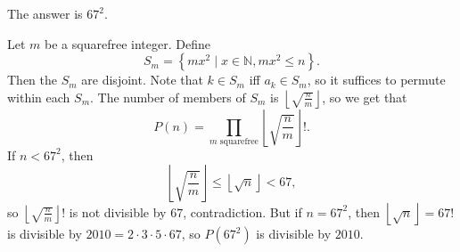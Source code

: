 The answer is $67^2$.

Let $m$ be a squarefree integer. Define \[S_m=\left\{mx^2\mid x\in\mathbb{N},mx^2\leq n\right\}.\] Then the $S_m$ are disjoint. Note that $k\in S_m$ iff $a_k\in S_m$, so it suffices to permute within each $S_m$. The number of members of $S_m$ is $\left\lfloor\sqrt{\frac{n}{m}}\right\rfloor$, so we get that \[P\left(n\right)=\prod_{m\text{ squarefree}}\left\lfloor\sqrt{\frac{n}{m}}\right\rfloor!.\] If $n<67^2$, then \[\left\lfloor\sqrt{\frac{n}{m}}\right\rfloor\leq\left\lfloor\sqrt{n}\right\rfloor<67,\] so $\left\lfloor\sqrt{\frac{n}{m}}\right\rfloor!$ is not divisible by $67$, contradiction. But if $n=67^2$, then $\left\lfloor\sqrt{n}\right\rfloor=67!$ is divisible by $2010=2\cdot3\cdot5\cdot67$, so $P\left(67^2\right)$ is divisible by $2010$.